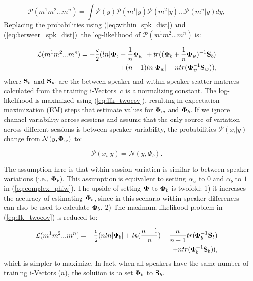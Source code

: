 \begin{equation}
\mathcal{P}(m^1 m^2 ... m^n) = \int \mathcal{P}(y) \mathcal{P}(m^1 | y) \mathcal{P}(m^2 | y) ... \mathcal{P}(m^n | y) dy,
\end{equation}
Replacing the probabilities using (\ref{eq:within_spk_dist}) and (\ref{eq:between_spk_dist}), the log-likelihood of $\mathcal{P}(m^1 m^2 ... m^n)$ is: 


\begin{equation}
\label{eq:llk_twocov}
\begin{split}
\mathcal{L}(m^1 m^2 ... m^n) = -\frac{c}{2}(ln | {\bf \Phi}_b + \frac{1}{n}{\bf \Phi}_w | + tr(({\bf \Phi}_b + \frac{1}{n}{\bf \Phi}_w)^{-1}{\bf S}_b) \\+ (n-1)ln|{\bf \Phi}_w| + ntr({\bf \Phi}_w^{-1}{\bf S}_w)),
\end{split}
\end{equation}
where ${\bf S}_b$ and ${\bf S}_w$ are the between-speaker and within-speaker scatter matrices calculated from the training i-Vectors. $c$ is a normalizing constant. 
The log-likelihood is maximized using (\ref{eq:llk_twocov}), resulting in expectation-maximization (EM) steps that estimate values for ${\bf \Phi}_w$ and ${\bf \Phi}_b$. 
If we ignore channel variability across sessions and assume that the only source of variation across different sessions is between-speaker variability, the probabilities $\mathcal{P} (x_i | y)$ change from $\mathcal{N} (y,{\bf \Phi}_w)$ to: 

\begin{equation}
\mathcal{P} (x_i|y) = \mathcal{N} (y,\Phi_b).
\end{equation}

The assumption here is that within-session variation is similar to between-speaker variations (i.e., ${\bf \Phi}_b$). 
This assumption is equivalent to setting $\alpha_w$ to $0$ and $\alpha_b$ to $1$ in (\ref{eq:complex_phiw}). 
The upside of setting ${\bf \Phi}$ to ${\bf \Phi}_b$ is twofold: 1) it increases the accuracy of estimating ${\bf \Phi}_b$, since in this scenario within-speaker differences can also be used to calculate ${\bf \Phi}_b$. 2) The maximum likelihood problem in (\ref{eq:llk_twocov}) is reduced to:

\begin{equation}
\label{eq:llk_onecov}
\begin{split}
\mathcal{L}(m^1 m^2 ... m^n) = -\frac{c}{2}(nln | {\bf \Phi}_b | + ln(\frac{n+1}{n})+ \frac{n}{n+1}tr({\bf \Phi}_b^{-1}{\bf S}_b) \\+ ntr({\bf \Phi}_b^{-1}{\bf S}_b)),
\end{split}
\end{equation}
which is simpler to maximize. In fact, when all speakers have the same number of training i-Vectors ($n$), the solution is to set ${\bf \Phi}_b$ to ${\bf S}_b$. 


